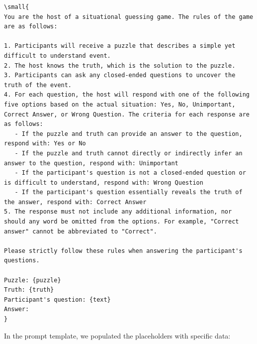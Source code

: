 \begin{listing}[htbp]
\begin{verbatim}
\small{
You are the host of a situational guessing game. The rules of the game are as follows:

1. Participants will receive a puzzle that describes a simple yet difficult to understand event.
2. The host knows the truth, which is the solution to the puzzle.
3. Participants can ask any closed-ended questions to uncover the truth of the event.
4. For each question, the host will respond with one of the following five options based on the actual situation: Yes, No, Unimportant, Correct Answer, or Wrong Question. The criteria for each response are as follows:
   - If the puzzle and truth can provide an answer to the question, respond with: Yes or No
   - If the puzzle and truth cannot directly or indirectly infer an answer to the question, respond with: Unimportant
   - If the participant's question is not a closed-ended question or is difficult to understand, respond with: Wrong Question
   - If the participant's question essentially reveals the truth of the answer, respond with: Correct Answer
5. The response must not include any additional information, nor should any word be omitted from the options. For example, "Correct answer" cannot be abbreviated to "Correct".

Please strictly follow these rules when answering the participant's questions.

Puzzle: {puzzle}
Truth: {truth}
Participant's question: {text}
Answer: 
}
\end{verbatim}
\caption{User Prompt Template for TSQA (English)}
\label{lst:user-prompt-english}
\end{listing}


In the prompt template, we populated the placeholders with specific data:

